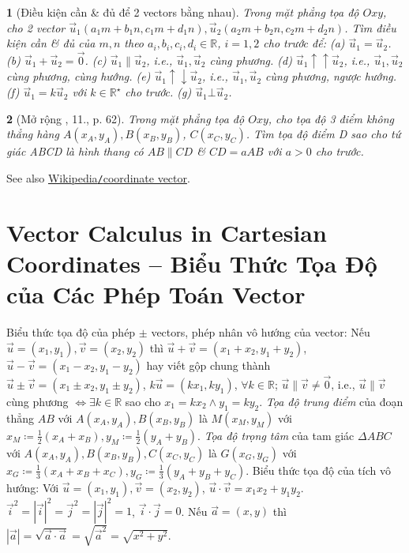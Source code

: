 \documentclass{article}
\newtheorem{baitoan}{}
\begin{document}
\begin{baitoan}[Điều kiện cần \& đủ để 2 vectors bằng nhau]
	Trong mặt phẳng tọa độ $Oxy$, cho 2 vector $\vec{u}_1(a_1m + b_1n,c_1m + d_1n),\vec{u}_2(a_2m + b_2n,c_2m + d_2n)$. Tìm điều kiện cần \& đủ của $m,n$ theo $a_i,b_i,c_i,d_i\in\mathbb{R}$, $i = 1,2$ cho trước để: (a) $\vec{u}_1 = \vec{u}_2$. (b) $\vec{u}_1 + \vec{u}_2 = \vec{0}$. (c) $\vec{u}_1\parallel\vec{u}_2$, i.e., $\vec{u}_1,\vec{u}_2$ cùng phương. (d) $\vec{u}_1\uparrow\uparrow\vec{u}_2$, i.e., $\vec{u}_1,\vec{u}_2$ cùng phương, cùng hướng. (e) $\vec{u}_1\uparrow\downarrow\vec{u}_2$, i.e., $\vec{u}_1,\vec{u}_2$ cùng phương, ngược hướng. (f) $\vec{u}_1 = k\vec{u}_2$ với $k\in\mathbb{R}^\star$ cho trước. (g) $\vec{u}_1\bot\vec{u}_2$.
\end{baitoan}

\begin{baitoan}[Mở rộng \cite{SBT_Toan_10_Canh_Dieu_tap_2}, 11., p. 62]
		Trong mặt phẳng tọa độ $Oxy$, cho tọa độ 3 điểm không thẳng hàng $A(x_A,y_A),B(x_B,y_B)$, $C(x_C,y_C)$. Tìm tọa độ điểm D sao cho tứ giác ABCD là hình thang có $AB\parallel CD$ \& $CD = aAB$ với $a > 0$ cho trước.
\end{baitoan}
See also \href{https://en.wikipedia.org/wiki/Coordinate_vector}{Wikipedia{\tt/}coordinate vector}.


\section{Vector Calculus in Cartesian Coordinates -- Biểu Thức Tọa Độ của Các Phép Toán Vector}
 {\sf Biểu thức tọa độ của phép $\pm$ vectors, phép nhân vô hướng của vector}: Nếu $\vec{u} = (x_1,y_1),\vec{v} = (x_2,y_2)$ thì $\vec{u} + \vec{v} = (x_1 + x_2,y_1 + y_2)$, $\vec{u} - \vec{v} = (x_1 - x_2,y_1 - y_2)$ hay viết gộp chung thành $\vec{u}\pm\vec{v} = (x_1\pm x_2,y_1\pm y_2)$, $k\vec{u} = (kx_1,ky_1)$, $\forall k\in\mathbb{R}$; $\vec{u}\parallel\vec{v}\ne\vec{0}$, i.e., $\vec{u}\parallel\vec{v}$ cùng phương $\Leftrightarrow\exists k\in\mathbb{R}$ sao cho $x_1 = kx_2\land y_1 = ky_2$.  {\it Tọa độ trung điểm} của đoạn thẳng $AB$ với $A(x_A,y_A),B(x_B,y_B)$ là $M(x_M,y_M)$ với $x_M\coloneqq\frac{1}{2}(x_A + x_B),y_M\coloneqq\frac{1}{2}(y_A + y_B)$.  {\it Tọa độ trọng tâm} của tam giác $\Delta ABC$ với $A(x_A,y_A),B(x_B,y_B),C(x_C,y_C)$ là $G(x_G,y_G)$ với $x_G\coloneqq\frac{1}{3}(x_A + x_B + x_C),y_G\coloneqq\frac{1}{3}(y_A + y_B + y_C)$.  {\sf Biểu thức tọa độ của tích vô hướng}: Với $\vec{u} = (x_1,y_1),\vec{v} = (x_2,y_2)$, $\vec{u}\cdot\vec{v} = x_1x_2 + y_1y_2$. $\vec{i}^2 = |\vec{i}|^2 = \vec{j}^2 = |\vec{j}|^2 = 1$, $\vec{i}\cdot\vec{j} = 0$. Nếu $\vec{a} = (x,y)$ thì $|\vec{a}| = \sqrt{\vec{a}\cdot\vec{a}} = \sqrt{\vec{a}^2} = \sqrt{x^2 + y^2}$.
\end{document}
